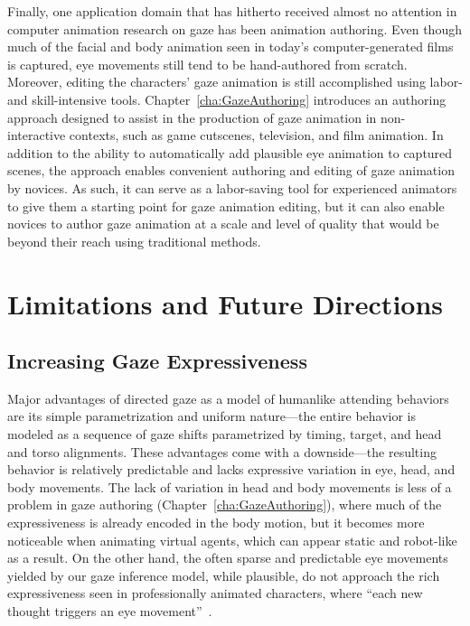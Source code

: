 Finally, one application domain that has hitherto received almost no attention in computer animation research on gaze has been animation authoring. Even though much of the facial and body animation seen in today's computer-generated films is captured, eye movements still tend to be hand-authored from scratch. Moreover, editing the characters' gaze animation is still accomplished using labor- and skill-intensive tools. Chapter~\ref{cha:GazeAuthoring} introduces an authoring approach designed to assist in the production of gaze animation in non-interactive contexts, such as game cutscenes, television, and film animation. In addition to the ability to automatically add plausible eye animation to captured scenes, the approach enables convenient authoring and editing of gaze animation by novices. As such, it can serve as a labor-saving tool for experienced animators to give them a starting point for gaze animation editing, but it can also enable novices to author gaze animation at a scale and level of quality that would be beyond their reach using traditional methods.

\section{Limitations and Future Directions}

\subsection{Increasing Gaze Expressiveness}

Major advantages of directed gaze as a model of humanlike attending behaviors are its simple parametrization and uniform nature---the entire behavior is modeled as a sequence of gaze shifts parametrized by timing, target, and head and torso alignments. These advantages come with a downside---the resulting behavior is relatively predictable and lacks expressive variation in eye, head, and body movements. The lack of variation in head and body movements is less of a problem in gaze authoring (Chapter~\ref{cha:GazeAuthoring}), where much of the expressiveness is already encoded in the body motion, but it becomes more noticeable when animating virtual agents, which can appear static and robot-like as a result.
On the other hand, the often sparse and predictable eye movements yielded by our gaze inference model, while plausible, do not approach the rich expressiveness seen in professionally animated characters, where ``each new thought triggers an eye movement''~\citep{maestri2001digital}.

